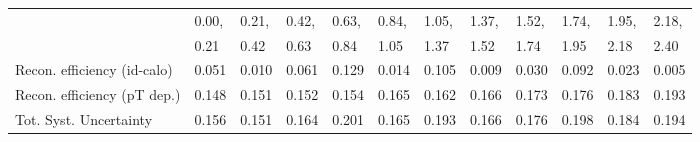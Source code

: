 \begin{tabular}{l|p{0.6cm}p{0.6cm}p{0.6cm}p{0.6cm}p{0.6cm}p{0.6cm}p{0.6cm}p{0.6cm}p{0.6cm}p{0.6cm}p{0.6cm}}
\hline
   & 0.00, & 0.21, & 0.42, & 0.63, & 0.84, & 1.05, & 1.37, & 1.52, & 1.74, & 1.95, & 2.18,  \\ 
   & 0.21 & 0.42 & 0.63 & 0.84 & 1.05 & 1.37 & 1.52 & 1.74 & 1.95 & 2.18 & 2.40  \\ 
\hline
Recon. efficiency (id-calo)              & 0.051 & 0.010 & 0.061 & 0.129 & 0.014 & 0.105 & 0.009 & 0.030 & 0.092 & 0.023 & 0.005 \\
\hline
Recon. efficiency (pT dep.)              & 0.148 & 0.151 & 0.152 & 0.154 & 0.165 & 0.162 & 0.166 & 0.173 & 0.176 & 0.183 & 0.193 \\
\hline
Tot. Syst. Uncertainty                   & 0.156 & 0.151 & 0.164 & 0.201 & 0.165 & 0.193 & 0.166 & 0.176 & 0.198 & 0.184 & 0.194 \\
\hline
\end{tabular}
